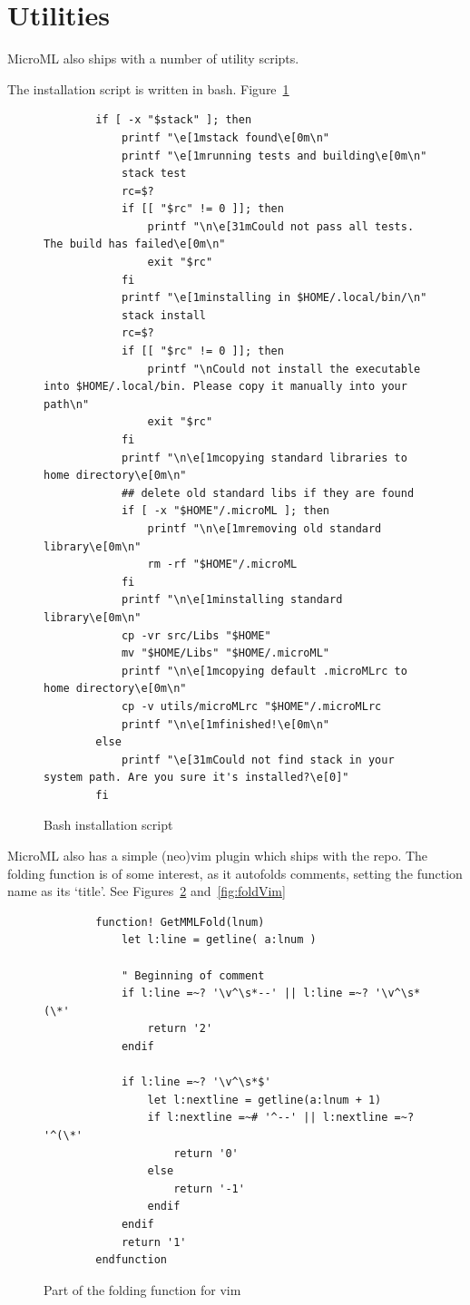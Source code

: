\section{Utilities}
MicroML also ships with a number of utility scripts.

The installation script is written in bash. Figure~\ref{fig:installation}
\begin{figure}
    \begin{verbatim}
        if [ -x "$stack" ]; then
            printf "\e[1mstack found\e[0m\n"
            printf "\e[1mrunning tests and building\e[0m\n"
            stack test 
            rc=$?
            if [[ "$rc" != 0 ]]; then
                printf "\n\e[31mCould not pass all tests. The build has failed\e[0m\n"
                exit "$rc" 
            fi
            printf "\e[1minstalling in $HOME/.local/bin/\n"
            stack install
            rc=$?
            if [[ "$rc" != 0 ]]; then
                printf "\nCould not install the executable into $HOME/.local/bin. Please copy it manually into your path\n"
                exit "$rc"
            fi
            printf "\n\e[1mcopying standard libraries to home directory\e[0m\n"
            ## delete old standard libs if they are found
            if [ -x "$HOME"/.microML ]; then
                printf "\n\e[1mremoving old standard library\e[0m\n"
                rm -rf "$HOME"/.microML
            fi
            printf "\n\e[1minstalling standard library\e[0m\n"
            cp -vr src/Libs "$HOME"
            mv "$HOME/Libs" "$HOME/.microML"
            printf "\n\e[1mcopying default .microMLrc to home directory\e[0m\n"
            cp -v utils/microMLrc "$HOME"/.microMLrc
            printf "\n\e[1mfinished!\e[0m\n"
        else 
            printf "\e[31mCould not find stack in your system path. Are you sure it's installed?\e[0]"
        fi
    \end{verbatim}
    \caption{Bash installation script}
\label{fig:installation}
\end{figure}

MicroML also has a simple (neo)vim plugin which ships with the repo. The folding function is of some
interest, as it autofolds comments, setting the function name as its `title'. See
Figures~\ref{fig:fold} and~\ref{fig:foldVim}

\begin{figure}
    \begin{verbatim}
        function! GetMMLFold(lnum) 
            let l:line = getline( a:lnum )

            " Beginning of comment
            if l:line =~? '\v^\s*--' || l:line =~? '\v^\s*(\*'
                return '2'
            endif

            if l:line =~? '\v^\s*$'
                let l:nextline = getline(a:lnum + 1)
                if l:nextline =~# '^--' || l:nextline =~? '^(\*'
                    return '0'
                else
                    return '-1'
                endif
            endif
            return '1'
        endfunction 
    \end{verbatim}
    \caption{Part of the folding function for vim}
\label{fig:fold}
\end{figure}

